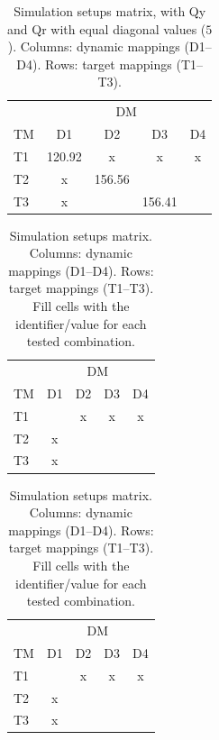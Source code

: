 \documentclass[preprint,12pt,authoryear]{elsarticle}
\begin{document}
\begin{table}[h]
  \centering
  \caption{Simulation setups matrix, with Qy and Qr with equal diagonal values (\(5\)). Columns: dynamic mappings (D1--D4). Rows: target mappings (T1--T3).}
  \label{tab:setups-matrix}
  \begin{tabular}{lcccc}
      \toprule
      & \multicolumn{4}{c}{DM} \\
      \cmidrule(lr){2-5}
      TM & D1 & D2 & D3 & D4 \\
      \midrule
      T1 & 120.92 & x & x & x \\
      T2 & x & 156.56 &  &  \\
      T3 & x &  & 156.41 &  \\
      \bottomrule
  \end{tabular}
\end{table}

\begin{table}[h]
  \centering
  \caption{Simulation setups matrix. Columns: dynamic mappings (D1--D4). Rows: target mappings (T1--T3). Fill cells with the identifier/value for each tested combination.}
  \label{tab:setups-matrix}
  \begin{tabular}{lcccc}
      \toprule
      & \multicolumn{4}{c}{DM} \\
      \cmidrule(lr){2-5}
      TM & D1 & D2 & D3 & D4 \\
      \midrule
      T1 &  & x & x & x \\
      T2 & x &  &  &  \\
      T3 & x &  &  &  \\
      \bottomrule
  \end{tabular}
\end{table}

\begin{table}[h]
  \centering
  \caption{Simulation setups matrix. Columns: dynamic mappings (D1--D4). Rows: target mappings (T1--T3). Fill cells with the identifier/value for each tested combination.}
  \label{tab:setups-matrix}
  \begin{tabular}{lcccc}
      \toprule
      & \multicolumn{4}{c}{DM} \\
      \cmidrule(lr){2-5}
      TM & D1 & D2 & D3 & D4 \\
      \midrule
      T1 &  & x & x & x \\
      T2 & x &  &  &  \\
      T3 & x &  &  &  \\
      \bottomrule
  \end{tabular}
\end{table}
\end{document}

